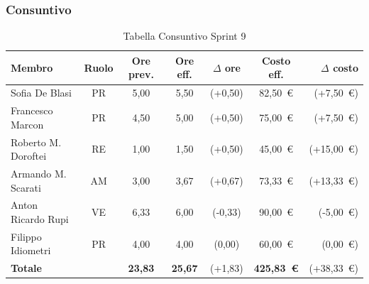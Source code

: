 \subsubsection{Consuntivo}
\begin{table}[H]
    \centering
    \renewcommand{\arraystretch}{1.3}
    \begin{tabularx}{\textwidth}{|X|c|c|c|c|c|r|}
        \hline
        \textbf{Membro} & \textbf{Ruolo} & \textbf{Ore prev.} &
        \textbf{Ore eff.} & \textbf{$\Delta$ ore} &
        \textbf{Costo eff.} & \textbf{$\Delta$ costo} \\
        \hline
        Sofia De Blasi       & PR & 5,00 & 5,50 & {\color{red}(+0,50)}  & 82{,}50~\euro & {\color{red}(+7{,}50~\euro)} \\
        Francesco Marcon     & PR & 4,50 & 5,00 & {\color{red}(+0,50)} & 75{,}00~\euro  & {\color{red}(+7{,}50~\euro)} \\
        Roberto M. Doroftei  & RE & 1,00 & 1,50 & {\color{red}(+0,50)} & 45{,}00~\euro  & {\color{red}(+15{,}00~\euro)} \\
        Armando M. Scarati   & AM & 3,00 & 3,67 & {\color{red}(+0,67)}  & 73{,}33~\euro  & {\color{red}(+13{,}33~\euro)} \\
        Anton Ricardo Rupi   & VE & 6,33 & 6,00 & {\color{green}(-0,33)}  & 90{,}00~\euro & {\color{green}(-5{,}00~\euro)} \\
        Filippo Idiometri    & PR & 4,00 & 4,00 & {\color{green}(0,00)} & 60{,}00~\euro  & {\color{green}(0{,}00~\euro)} \\
        \hline
        \textbf{Totale} & & \textbf{23,83} & \textbf{25,67} & {\color{red}(+1,83)} & \textbf{425{,}83~\euro} & {\color{red}(+38{,}33~\euro)} \\
        \hline
    \end{tabularx}
    \caption{Tabella Consuntivo Sprint 9}
\end{table}


